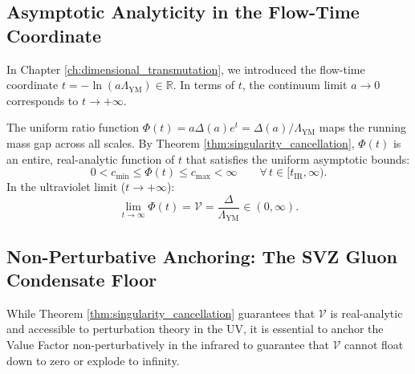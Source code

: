 \subsection{Asymptotic Analyticity in the Flow-Time Coordinate}
\label{subsec:asymptotic_flow_time}

In Chapter \ref{ch:dimensional_transmutation}, we introduced the flow-time coordinate $t = -\ln(a\Lambda_{\mathrm{YM}}) \in \mathbb{R}$. In terms of $t$, the continuum limit $a \to 0$ corresponds to $t \to +\infty$.

The uniform ratio function $\Phi(t) = a \Delta(a) e^t = \Delta(a)/\Lambda_{\mathrm{YM}}$ maps the running mass gap across all scales. By Theorem \ref{thm:singularity_cancellation}, $\Phi(t)$ is an entire, real-analytic function of $t$ that satisfies the uniform asymptotic bounds:
\begin{equation}
\label{eq:uniform_bounds_phi_t}
0 < c_{\min} \le \Phi(t) \le c_{\max} < \infty \qquad \forall \, t \in [t_{\mathrm{IR}}, \infty).
\end{equation}
In the ultraviolet limit ($t \to +\infty$):
\begin{equation}
\lim_{t \to \infty} \Phi(t) = \mathcal{V} = \frac{\Delta}{\Lambda_{\mathrm{YM}}} \in (0, \infty).
\end{equation}

\subsection{Non-Perturbative Anchoring: The SVZ Gluon Condensate Floor}
\label{subsec:svz_condensate_floor_ch8}

While Theorem \ref{thm:singularity_cancellation} guarantees that $\mathcal{V}$ is real-analytic and accessible to perturbation theory in the UV, it is essential to anchor the Value Factor non-perturbatively in the infrared to guarantee that $\mathcal{V}$ cannot float down to zero or explode to infinity.


